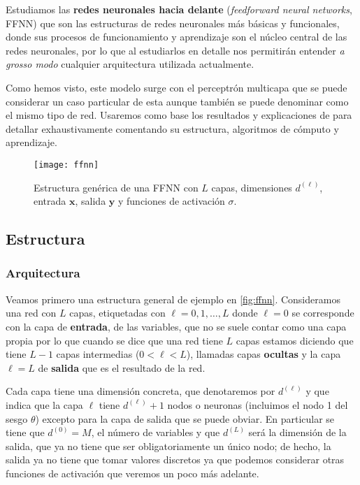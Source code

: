 Estudiamos las \textbf{redes neuronales hacia delante} (\emph{feedforward neural networks}, FFNN) que son las estructuras de redes neuronales más básicas y funcionales, donde sus procesos de funcionamiento y aprendizaje son el núcleo central de las redes neuronales, por lo que al estudiarlos en detalle nos permitirán entender \emph{a grosso modo} cualquier arquitectura utilizada actualmente.

Como hemos visto, este modelo surge con el perceptrón multicapa que se puede considerar un caso particular de esta aunque también se puede denominar como el mismo tipo de red. Usaremos como base los resultados y explicaciones de \cite{abu2012learning} para detallar exhaustivamente comentando su estructura, algoritmos de cómputo y aprendizaje.

\begin{figure}[htpb]
  \centering
  \texttt{[image: ffnn]}
  \caption{Estructura genérica de una FFNN con $L$ capas, dimensiones $d^{(\ell)}$, entrada $\textbf{x}$, salida $\textbf{y}$ y funciones de activación $\sigma$.}
  \label{fig:ffnn}
\end{figure}

\subsection{Estructura}

\subsubsection{Arquitectura}

Veamos primero una estructura general de ejemplo en \autoref{fig:ffnn}. Consideramos una red con $L$ capas, etiquetadas con $\ell = 0, 1, \ldots, L$ donde $\ell = 0$ se corresponde con la capa de \textbf{entrada}, de las variables, que no se suele contar como una capa propia por lo que cuando se dice que una red tiene $L$ capas estamos diciendo que tiene $L-1$ capas intermedias ($0 < \ell < L$), llamadas capas \textbf{ocultas} y la capa $\ell = L$ de \textbf{salida} que es el resultado de la red.

Cada capa tiene una dimensión concreta, que denotaremos por $d^{(\ell)}$ y que indica que la capa $\ell$ tiene $d^{(\ell)} + 1$ nodos o neuronas (incluimos el nodo 1 del sesgo $\theta$) excepto para la capa de salida que se puede obviar. En particular se tiene que $d^{(0)} = M$, el número de variables y que $d^{(L)}$ será la dimensión de la salida, que ya no tiene que ser obligatoriamente un único nodo; de hecho, la salida ya no tiene que tomar valores discretos ya que podemos considerar otras funciones de activación que veremos un poco más adelante.

